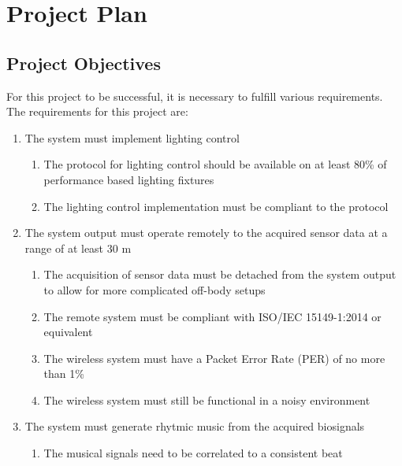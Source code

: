 \section{Project Plan}
\subsection{Project Objectives}
For this project to be successful, it is necessary to fulfill various requirements.
The requirements for this project are:

\begin{enumerate}
    \item The system must implement lighting control
    \begin{enumerate}
        \item The protocol for lighting control should be available on at least 80\% of performance based lighting fixtures
        \item The lighting control implementation must be compliant to the protocol
    \end{enumerate}
    \item The system output must operate remotely to the acquired sensor data at a range of at least 30 m
    \begin{enumerate}
        \item The acquisition of sensor data must be detached from the system output
        to allow for more complicated off-body setups
        \item The remote system must be compliant with ISO/IEC 15149-1:2014 or equivalent
        \item The wireless system must have a Packet Error Rate (PER) of no more than 1\%
        \item The wireless system must still be functional in a noisy environment
    \end{enumerate}
    \item The system must generate rhytmic music from the acquired biosignals
    \begin{enumerate}
        \item The musical signals need to be correlated to a consistent beat
    \end{enumerate}
\end{enumerate}

